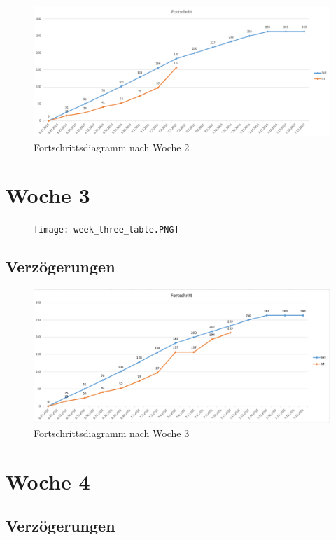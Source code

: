 \begin{figure}[!htbp]
	\centering
	\includegraphics[width=380pt]{resourcen/week_two_diagram.PNG}
	\caption{Fortschrittsdiagramm nach Woche 2}
	\label{fig:week_two_diagram}
\end{figure}

\section{Woche 3}
\begin{figure}[!htbp]
	\centering
	\texttt{[image: week\_three\_table.PNG]}
	\caption{}
	\label{fig:week_three_table}
\end{figure}
\subsection{Verzögerungen}
\begin{figure}[!htbp]
	\centering
	\includegraphics[width=380pt]{resourcen/week_three_diagram.PNG}
	\caption{Fortschrittsdiagramm nach Woche 3}
	\label{Restliche nicht abgeschlossene Aufgaben für Woche 3 und 4}
\end{figure}
\section{Woche 4}
\subsection{Verzögerungen}